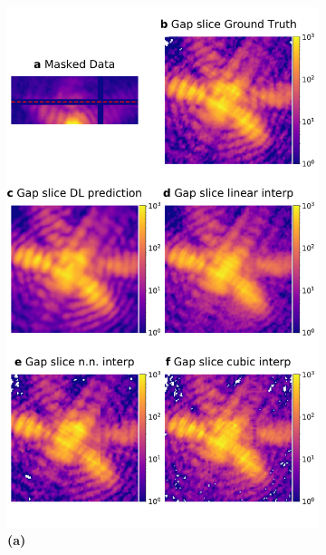 \begin{figure}[h]
    \centering
    \begin{subfigure}{0.47\textwidth} %
        \centering
        \includegraphics[width=\linewidth]{figures/Inpainting/newfig3_suppl.pdf}
        \caption{\textbf{(a)}}
    \end{subfigure}
    \hfill
    \begin{subfigure}{0.47\textwidth}
        \centering

\end{subfigure}
\end{figure}
